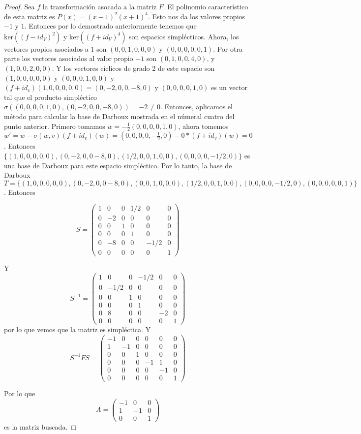 \documentclass[letter,twoside,12pt]{article}
\begin{document}
\begin{itemize}
\begin{proof}
Sea $ f $ la transformación asocada a la matriz $ F $. El polinomio característico de esta matriz es $ P(x) = (x-1)^2(x+1)^4 $. Esto nos da los valores propios $ -1 $ y $ 1 $. Entonces por lo demostrado anteriormente tenemos que $ \text{ker}((f-id_V)^{2}) $ y $ \text{ker}((f+id_V)^4) $ son espacios simplécticos. Ahora, los vectores propios asociados a 1 son $ (0,0,1,0,0,0) $ y $ (0,0,0,0,0,1) $. Por otra parte los vectores asociados al valor propio $ -1 $ son $ (0, 1, 0, 0, 4, 0) $, y $ (1, 0, 0, 2, 0, 0) $. Y los vectores cíclicos de grado 2 de este espacio son $ (1,0,0,0,0,0) $ y $ (0,0,0,1,0,0) $ y $ (f+id_v)(1,0,0,0,0,0)=(0,-2,0,0,-8,0)$ y $ (0,0,0,0,1,0) $ es un vector tal que el producto simpléctico $ \sigma((0,0,0,0,1,0),(0,-2,0,0,-8,0))=-2 \not = 0 $. Entonces, aplicamos el método para calcular la base de Darboux mostrada en el númeral cuatro del punto anterior. Primero tomamos $ w = -\frac{1}{2}(0,0,0,0,1,0) $, ahora tomemos $ w' = w-\sigma(w,v)(f+id_v)(w)= (0,0,0,0,-\frac{1}{2},0)-0*(f+id_v)(w)=0  $. Entonces $ \{(1,0,0,0,0,0),(0,-2,0,0-8,0),(1/2,0,0,1,0,0),(0,0,0,0,-1/2,0)\} $ es una base de Darboux para este espacio simpléctico. Por lo tanto, la base de Darboux $ T = \{(1,0,0,0,0,0),(0,-2,0,0-8,0),(0,0,1,0,0,0),(1/2,0,0,1,0,0),(0,0,0,0,-1/2,0),(0,0,0,0,0,1)\} $. Entonces

$$ S = \begin{pmatrix}
 1 & 0 & 0 & 1/2 & 0 & 0
\\0 & -2 & 0 & 0 & 0 & 0
\\0 & 0 & 1 & 0 & 0 & 0
\\0 & 0 & 0 & 1 & 0 & 0
\\0 & -8 & 0 & 0 & -1/2 & 0
\\0 & 0 & 0 & 0 & 0 & 1
\end{pmatrix}  $$

Y  $$ S^{-1} = \begin{pmatrix}
 1 & 0 & 0 & -1/2 & 0 & 0
\\0 & -1/2 & 0 & 0 & 0 & 0
\\0 & 0 & 1 & 0 & 0 & 0
\\0 & 0 & 0 & 1 & 0 & 0
\\0 & 8 & 0 & 0 & -2 & 0
\\0 & 0 & 0 & 0 & 0 & 1
\end{pmatrix} $$ por lo que vemos que la matriz es simpléctica. Y $$ S^{-1}FS = \begin{pmatrix}
 -1 & 0 & 0 & 0 & 0 & 0
\\1 & -1 & 0 & 0 & 0 & 0
\\0 & 0 & 1 & 0 & 0 & 0
\\0 & 0 & 0 & -1 & 1 & 0
\\0 & 0 & 0 & 0 & -1 & 0
\\0 & 0 & 0 & 0 & 0 & 1
\end{pmatrix} $$

Por lo que $$ A = \begin{pmatrix}
 -1 & 0 & 0
\\1 & -1 & 0
\\0 & 0 & 1
\end{pmatrix} $$ es la matriz buscada.
\end{proof} 
\end{itemize}
\end{document}
